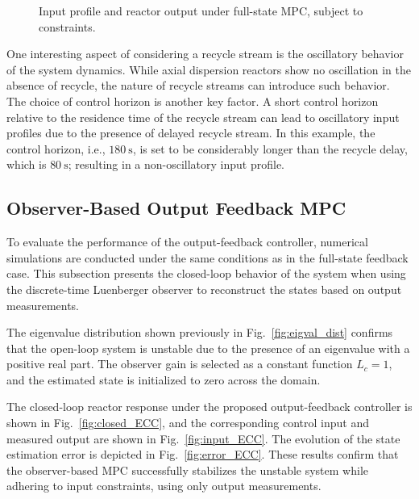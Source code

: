 \begin{figure}[!htbp]
    \centering
    
    \caption{Input profile and reactor output under full-state MPC, subject to constraints.}
    \label{fig:input_ACC}
\end{figure}

One interesting aspect of considering a recycle stream is the oscillatory behavior of the system dynamics. While axial dispersion reactors show no oscillation in the absence of recycle, the nature of recycle streams can introduce such behavior. The choice of control horizon is another key factor. A short control horizon relative to the residence time of the recycle stream can lead to oscillatory input profiles due to the presence of delayed recycle stream. In this example, the control horizon, i.e., $180~\mathrm{s}$, is set to be considerably longer than the recycle delay, which is $80~\mathrm{s}$; resulting in a non-oscillatory input profile.

\subsection{Observer-Based Output Feedback MPC}

To evaluate the performance of the output-feedback controller, numerical simulations are conducted under the same conditions as in the full-state feedback case. This subsection presents the closed-loop behavior of the system when using the discrete-time Luenberger observer to reconstruct the states based on output measurements.

The eigenvalue distribution shown previously in Fig.~\ref{fig:eigval_dist} confirms that the open-loop system is unstable due to the presence of an eigenvalue with a positive real part. The observer gain is selected as a constant function $L_c = 1$, and the estimated state is initialized to zero across the domain. %

The closed-loop reactor response under the proposed output-feedback controller is shown in Fig.~\ref{fig:closed_ECC}, and the corresponding control input and measured output are shown in Fig.~\ref{fig:input_ECC}. The evolution of the state estimation error is depicted in Fig.~\ref{fig:error_ECC}. These results confirm that the observer-based MPC successfully stabilizes the unstable system while adhering to input constraints, using only output measurements.


